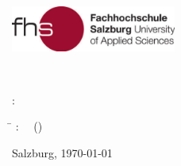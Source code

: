 \begin{titlepage}
\begin{center}
\Huge{
	{\textbf{\titlecap \ipapertype}}
}
\end{center}
\newpage

\thispagestyle{empty}

\hfill \includegraphics[height=1.5cm]{images/FHSLogo.pdf}

\vspace*{2cm}

\Large{

\MakeUppercase{\ititle}

\vspace*{1cm}

\MakeSentenceCase{\ipapertype}~\tattainment

\vspace*{0.5cm}

\textit{\tdegree}
}


\vspace*{1.5cm}
{\large
\tauthor: \iauthor
}
\vfill

{\normalsize
\tsubmitted

\vspace*{1cm}

\begin{tabbing}
\hspace*{1.4in}\=\kill
\texamined: \> \ \isupervisor~(\tsupervisor)
\end{tabbing}

\vfill
{}
Salzburg, \today
{}
}
\end{titlepage}